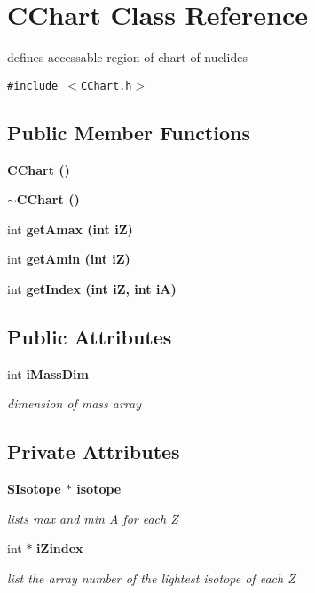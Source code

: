 \section{CChart Class Reference}
\label{classCChart}
defines accessable region of chart of nuclides  


{\tt \#include $<$CChart.h$>$}

\subsection*{Public Member Functions}
\begin{CompactItemize}
\item 
\bf{CChart} ()
\item 
\bf{$\sim$CChart} ()
\item 
int \bf{get\-Amax} (int i\-Z)
\item 
int \bf{get\-Amin} (int i\-Z)
\item 
int \bf{get\-Index} (int i\-Z, int i\-A)
\end{CompactItemize}
\subsection*{Public Attributes}
\begin{CompactItemize}
\item 
int \bf{i\-Mass\-Dim}\label{classCChart_7c134e430124d634fb643fde634137e0}

\begin{CompactList}\small\item\em dimension of mass array \item\end{CompactList}\end{CompactItemize}
\subsection*{Private Attributes}
\begin{CompactItemize}
\item 
\bf{SIsotope} $\ast$ \bf{isotope}\label{classCChart_b078bb8c0ccd761e510a2a089d07a6b1}

\begin{CompactList}\small\item\em lists max and min A for each Z \item\end{CompactList}\item 
int $\ast$ \bf{i\-Zindex}\label{classCChart_ed688736582efc7b865923a72c02e71e}

\begin{CompactList}\small\item\em list the array number of the lightest isotope of each Z \item\end{CompactList}\end{CompactItemize}

